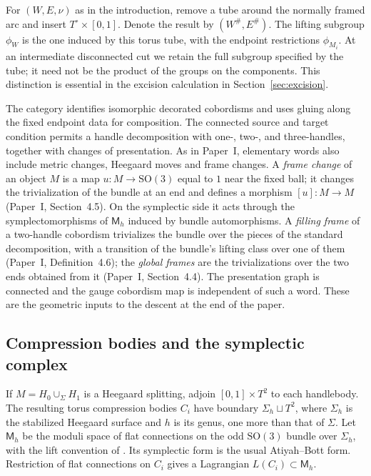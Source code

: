 \documentclass[11pt]{amsart}
\theoremstyle{definition}
\theoremstyle{remark}
\theoremstyle{plain}
\numberwithin{equation}{section}
\newcommand{\SO}{\mathrm{SO}}
\newcommand{\Msf}{\mathsf M}
\begin{document}
For $(W,E,\nu)$ as in the introduction, remove a tube around the
normally framed arc and insert $T^\circ\times[0,1]$. Denote the
result by $(W^\#,E^\#)$. The lifting subgroup $\phi_W$ is the one
induced by this torus tube, with the endpoint restrictions $\phi_{M_i}$.
At an intermediate disconnected cut we retain the full subgroup
specified by the tube; it need not be the product of the groups on
the components. This distinction is essential in the excision
calculation in Section~\ref{sec:excision}.

The category identifies isomorphic decorated cobordisms and uses
gluing along the fixed endpoint data for composition. The connected
source and target condition permits a handle decomposition with
one-, two-, and three-handles, together with changes of presentation.
As in Paper~I, elementary words also include metric changes, Heegaard moves and frame changes. A
\emph{frame change} of an object $M$ is a map $u\colon M\to\SO(3)$ equal to $1$ near the fixed
ball; it changes the trivialization of the bundle at an end and defines a morphism $[u]\colon M\to
M$ (Paper~I, Section~4.5). On the symplectic side it acts through the symplectomorphisms of
$\Msf_h$ induced by bundle automorphisms. A \emph{filling frame} of a two-handle cobordism trivializes the bundle over the pieces of the standard decomposition, with a transition of the bundle's lifting class over one of them (Paper~I, Definition~4.6); the \emph{global frames} are the trivializations over the two ends obtained from it (Paper~I, Section~4.4). The presentation graph is
connected and the gauge cobordism map is independent of such a
word. These are the geometric inputs to the descent at the end of
the paper.

\subsection{Compression bodies and the symplectic complex}
If $M=H_0\cup_\Sigma H_1$ is a Heegaard splitting, adjoin $[0,1]\times T^2$ to each handlebody.
The resulting torus compression bodies $C_i$ have boundary $\Sigma_h\sqcup T^2$, where $\Sigma_h$
is the stabilized Heegaard surface and $h$ is its genus, one more than that of $\Sigma$. Let $\Msf_h$ be the moduli space of flat connections on the
odd $\SO(3)$ bundle over $\Sigma_h$, with the lift convention of
\cite[Section~2]{DFL}. Its symplectic form is the usual
Atiyah--Bott form. Restriction of flat connections on $C_i$ gives a
Lagrangian $L(C_i)\subset\Msf_h$.
\end{document}
